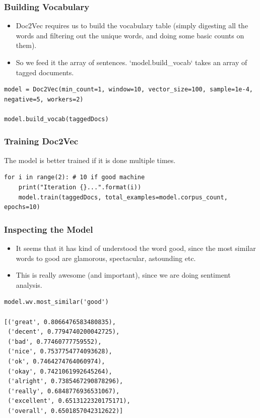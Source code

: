 \begin{frame}[fragile]\frametitle{Building Vocabulary}
\begin{itemize}
\item Doc2Vec requires us to build the vocabulary table (simply digesting all the words and filtering out the unique words, and doing some basic counts on them). 
\item So we feed it the array of sentences. `model.build\_vocab` takes an array of tagged documents.
\end{itemize}
\begin{lstlisting}
model = Doc2Vec(min_count=1, window=10, vector_size=100, sample=1e-4, negative=5, workers=2)

model.build_vocab(taggedDocs)
\end{lstlisting}

\end{frame}


\begin{frame}[fragile]\frametitle{Training Doc2Vec}
The model is better trained if it is done multiple times. 
\begin{lstlisting}
for i in range(2): # 10 if good machine
    print("Iteration {}...".format(i))
    model.train(taggedDocs, total_examples=model.corpus_count, epochs=10)
\end{lstlisting}
\end{frame}

\begin{frame}[fragile]\frametitle{Inspecting the Model}

\begin{itemize}
\item It seems that it has kind of understood the word good, since the most similar words to good are glamorous, spectacular, astounding etc. 
\item This is really awesome (and important), since we are doing sentiment analysis.
\end{itemize}

\begin{lstlisting}
model.wv.most_similar('good')

[('great', 0.8066476583480835),
 ('decent', 0.7794740200042725),
 ('bad', 0.77460777759552),
 ('nice', 0.7537754774093628),
 ('ok', 0.7464274764060974),
 ('okay', 0.7421061992645264),
 ('alright', 0.7385467290878296),
 ('really', 0.6848776936531067),
 ('excellent', 0.6513122320175171),
 ('overall', 0.6501857042312622)]
\end{lstlisting}
\end{frame}


